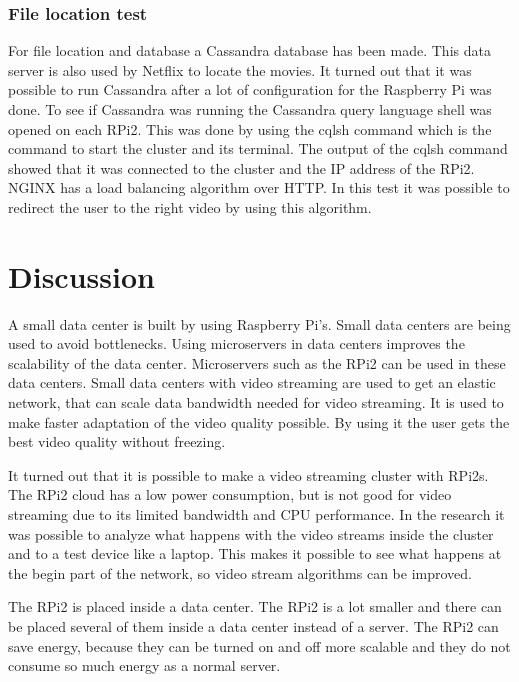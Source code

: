 \documentclass{sig-alternate-br}
\begin{document}
\subsubsection{File location test}
For file location and database a Cassandra database has been made. This data server is also used by Netflix to locate the movies. It turned out that it was possible to run Cassandra after a lot of configuration for the Raspberry Pi was done. To see if Cassandra was running the Cassandra query language shell was  opened on each RPi2. This was done by using the cqlsh command which is the command to start the cluster and its terminal. The output of the cqlsh command showed that it was connected to the cluster and the IP address of the RPi2. \newline
NGINX has a load balancing algorithm over HTTP. In this test it was possible to redirect the user to the right video by using this algorithm. 

\section{Discussion}

A small data center is built by using Raspberry Pi's. Small data centers are being used to avoid bottlenecks. Using microservers in data centers improves the scalability of the data center. Microservers such as the RPi2 can be used in these data centers. Small data centers with video streaming are used to get an elastic network, that can scale data bandwidth needed for video streaming. It is used to make faster adaptation of the video quality possible. By using it the user gets the best video quality without freezing. 

It turned out that it is possible to make a video streaming cluster with RPi2s. The RPi2 cloud has a low power consumption, but is not good for video streaming due to its limited bandwidth and CPU performance. In the research it was possible to analyze what happens with the video streams inside the cluster and to a test device like a laptop. This makes it possible to see what happens at the begin part of the network, so video stream algorithms can be improved.  

The RPi2 is placed inside a data center. The RPi2 is a lot smaller and there can be placed several of them inside a data center instead of a server. The RPi2 can save energy, because they can be turned on and off more scalable and they do not consume so much energy as a normal server. 
\end{document}
